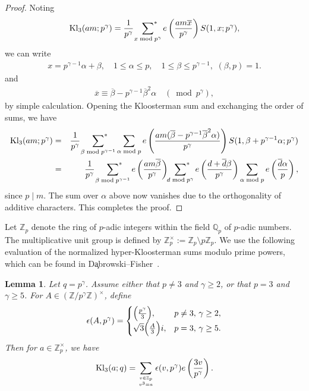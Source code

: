\documentclass[11pt,reqno]{amsart}
\newcommand{\bna}{\begin{eqnarray*}}
\newcommand{\ena}{\end{eqnarray*}}
\numberwithin{equation}{section}
\theoremstyle{plain}
\newtheorem{lemma}{Lemma}[section]
\theoremstyle{definition}
\newcommand{\Kl}{\mathrm{Kl}}
\begin{document}
\begin{proof}
Noting
\bna
\text{Kl}_3(am;p^\gamma)=\frac{1}{p^\gamma}\,\,\sideset{}{^*}
\sum_{x\bmod p^\gamma}e\left(\frac{am\overline{x}}{p^\gamma}\right)S(1,x; p^\gamma),
\ena
we can write
\bna
x=p^{\gamma-1}\alpha+\beta,\quad 1\leq\alpha\leq p,\quad 1\leq\beta\leq p^{\gamma-1},\,\, (\beta, p)=1.
\ena
and
\bna
\overline{x}\equiv\overline{\beta}-p^{\gamma-1}\overline{\beta}^2\alpha\quad(\bmod p^\gamma),
\ena
by simple calculation.
Opening the Kloosterman sum and exchanging the order of sums, we have
\bna\label{b6}
\text{Kl}_3(am;p^\gamma)&=&\frac{1}{p^\gamma}\,\,\sideset{}{^*}\sum\limits_{{\beta \bmod p^{\gamma-1}}} \sum_{\alpha \bmod p}
e\left(\frac{am(\overline{\beta}-p^{\gamma-1}\overline{\beta}^2\alpha)}{p^\gamma}\right)S(1,\beta + p^{\gamma-1} \alpha; p^\gamma)\nonumber\\
&=&\frac{1}{p^\gamma}\,\,\sideset{}{^*}\sum\limits_{{\beta \bmod p^{\gamma-1}}}
e\left(\frac{am\overline{\beta}}{p^\gamma}\right)
\sideset{}{^*}\sum_{d\bmod p^\gamma}e\left(\frac{d+\overline{d}\beta}{p^\gamma}\right)
\sum_{\alpha \bmod p}e\left(\frac{\overline{d}\alpha}{p}\right),
\ena
since $p\mid m$.
The sum over $\alpha$ above now vanishes due to the orthogonality of additive characters.
This completes the proof.
\end{proof}
Let $\mathbb{Z}_p$ denote the ring of $p$-adic integers within the field $\mathbb{Q}_p$ of $p$-adic numbers. 
The multiplicative unit group is defined by
$\mathbb{Z}_p^\times := \mathbb{Z}_p \setminus p\mathbb{Z}_p.$
We use the following evaluation of the normalized hyper-Kloosterman sums modulo prime powers,
which can be found in D\c{a}browski--Fisher~\cite[Eqs.~(1.16)--(1.17)]{DF1997}.
\begin{lemma}\label{lem:Kloosterman}
Let $q=p^\gamma$. Assume either that $p\neq3$ and
$\gamma\geq2$, or that $p=3$ and $\gamma\geq5$. For $A\in(\mathbb{Z}/p^\gamma\mathbb{Z})^\times$, define
\begin{align*}
\epsilon(A,p^\gamma)=
\begin{cases}
\Bigl(\frac{p^\gamma}{3}\Bigr), & p\neq3, \,\gamma \geq 2,\\
\sqrt3\Bigl(\frac{A}{3}\Bigr)i,& p=3, \,\gamma \geq 5.
\end{cases}
\end{align*}
Then for $a\in \mathbb{Z}_p^{\times}$, we have 
\begin{equation*}
\Kl_3(a;q)=\sum_{v \in \mathbb{Z}_p\atop v^3= a}\epsilon(v,p^\gamma)e\left(\frac{3v}{p^\gamma}\right).
\end{equation*}
\end{lemma}
\end{document}
